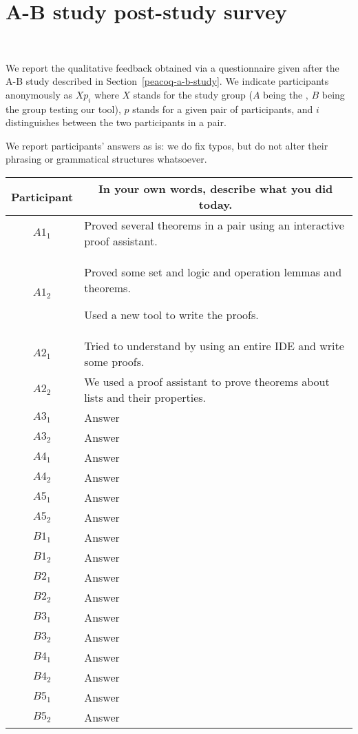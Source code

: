 \chapter{\PeaCoq{} A-B study post-study survey}~\label{appendix-peacoq-a-b-study}

We report the qualitative feedback obtained via a questionnaire given after the
A-B study described in Section~\ref{peacoq-a-b-study}.  We indicate participants
anonymously as $Xp_{i}$ where $X$ stands for the study group ($A$ being the
, $B$ being the group testing our tool), $p$ stands for a
given pair of participants, and $i$ distinguishes between the two participants
in a pair.

We report participants' answers as is: we do fix typos, but do not alter their
phrasing or grammatical structures whatsoever.

\noindent
\begin{tabularx}{\linewidth}{@{}cX@{}}
  \toprule
  Participant & \multicolumn{1}{c}{
    \textbf{In your own words, describe what you did today.}
  } \\ \midrule
  $A1_{1}$ & Proved several theorems in a pair using an interactive proof assistant. \\
  $A1_{2}$ & \begin{enumerate*} \item Proved some set and logic and operation lemmas and theorems. \item Used a new tool to write the proofs. \end{enumerate*} \\
  $A2_{1}$ & Tried to understand \Coq{} by using an entire IDE and write some proofs. \\
  $A2_{2}$ & We used a proof assistant to prove theorems about lists and their properties. \\
  $A3_{1}$ & Answer \\
  $A3_{2}$ & Answer \\
  $A4_{1}$ & Answer \\
  $A4_{2}$ & Answer \\
  $A5_{1}$ & Answer \\
  $A5_{2}$ & Answer \\
  \midrule
  $B1_{1}$ & Answer \\
  $B1_{2}$ & Answer \\
  $B2_{1}$ & Answer \\
  $B2_{2}$ & Answer \\
  $B3_{1}$ & Answer \\
  $B3_{2}$ & Answer \\
  $B4_{1}$ & Answer \\
  $B4_{2}$ & Answer \\
  $B5_{1}$ & Answer \\
  $B5_{2}$ & Answer \\
  \bottomrule
\end{tabularx}{\parfillskip=0pt\par}

